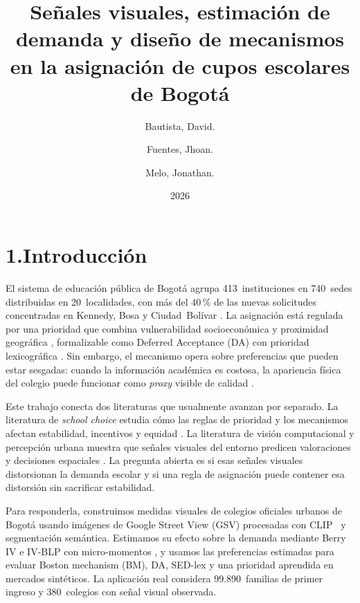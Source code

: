 \documentclass[12pt,a4paper]{article}
\begin{document}
\title{\textbf{Señales visuales, estimación de demanda y diseño de mecanismos en la asignación de cupos escolares de Bogotá}}
\author{Bautista, David. \and Fuentes, Jhoan. \and Melo, Jonathan.}
\date{2026}
\maketitle

\section*{1.\quad Introducción}

El sistema de educación pública de Bogotá agrupa 413~instituciones en 740~sedes
distribuidas en 20~localidades, con más del 40\,\% de las nuevas solicitudes
concentradas en Kennedy, Bosa y Ciudad~Bolívar
\citep{SED2023caracterizacion}. La asignación está regulada por una prioridad
que combina vulnerabilidad socioeconómica y proximidad geográfica
\citep{Resolucion1587}, formalizable como Deferred Acceptance (DA) con prioridad
lexicográfica \citep{GaleShapley1962}. Sin embargo, el mecanismo opera sobre
preferencias que pueden estar sesgadas: cuando la información académica es
costosa, la apariencia física del colegio puede funcionar como \emph{proxy}
visible de calidad \citep{Hastings2009,HastingsWeinstein2008,Naik2017,Dubey2016}.

Este trabajo conecta dos literaturas que usualmente avanzan por separado. La
literatura de \emph{school choice} estudia cómo las reglas de prioridad y los
mecanismos afectan estabilidad, incentivos y equidad \citep{AbdulSonmez2003}.
La literatura de visión computacional y percepción urbana muestra que señales
visuales del entorno predicen valoraciones y decisiones espaciales
\citep{Naik2017,Dubey2016}. La pregunta abierta es si esas señales visuales
distorsionan la demanda escolar y si una regla de asignación puede contener esa
distorsión sin sacrificar estabilidad.

Para responderla, construimos medidas visuales de colegios oficiales urbanos de
Bogotá usando imágenes de Google Street View (GSV) procesadas con
CLIP~\citep{Radford2021} y segmentación semántica. Estimamos su efecto sobre la
demanda mediante Berry IV e IV-BLP con micro-momentos
\citep{Berry1994,ConlonGortmaker2020}, y usamos las preferencias estimadas para
evaluar Boston mechanism (BM), DA, SED-lex y una prioridad aprendida en mercados
sintéticos. La aplicación real considera 99{.}890~familias de primer ingreso y
380~colegios con señal visual observada.
\end{document}
